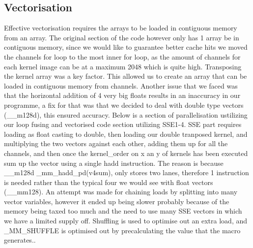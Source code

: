 \documentclass[12pt,fleqn,leqno,letterpaper]{article}
\begin{document}
\subsection{Vectorisation}
Effective vectorisation requires the arrays to be loaded in contiguous memory from an array. The
original section of the code however only has 1 array be in contiguous memory, since we would like to
guarantee better cache hits we moved the channels for loop to the most inner for loop, as the amount of
channels for each kernel image can be at a maximum 2048 which is quite high. 
Transposing the kernel array was a key factor. This allowed us to create an array that can be loaded in contiguous
memory from channels. Another issue that we faced was that the horizontal addition of 4 very big floats results in
an inaccuracy in our programme, a fix for that was that we decided to deal with double type vectors (\_\_m128d), this
ensured accuracy. Below is a section of parallelisation ustilizing our loop fusing and vectorised code section utilizing
SSE1-4. SSE part requires loading as float casting to double, then loading our double tranposed kernel, and multiplying
the two vectors against each other, adding them up for all the channels, and then once the kernel\_order on x an y of kernels
has been executed sum up the vector using a single hadd instruction. The reason is because \_\_m128d \_mm\_hadd\_pd(v4sum), only
stores two lanes, therefore 1 instruction is needed rather than the typical four we would see with float vectors (\_\_mm128).
An attempt was made for chaining loads by splitting into many vector variables, however it ended up being slower probably because
of the memory being taxed too much and the need to use many SSE vectors in which we have a limited supply off. Shuffling is
used to optimise out an extra load, and \_MM\_SHUFFLE is optimised out by precalculating the value that the macro generates.. 
\end{document}
